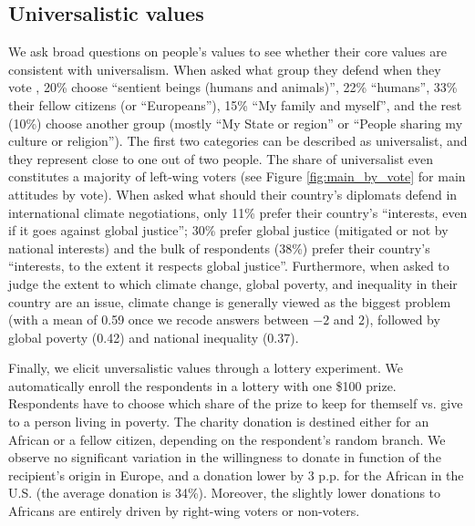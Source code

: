 \subsection{Universalistic values}
We ask broad questions on people's values to see whether their core values are consistent with universalism. When asked what group they defend when they vote%
, 20\% choose ``sentient beings (humans and animals)'', 22\% ``humans'', 33\% their fellow citizens (or ``Europeans''), 15\% ``My family and myself'', and the rest (10\%) choose another group (mostly ``My State or region'' or ``People sharing my culture or religion''). The first two categories can be described as universalist, and they represent close to one out of two people. The share of universalist even constitutes a majority of left-wing voters (see Figure \ref{fig:main_by_vote} for main attitudes by vote). 
When asked what should their country's diplomats defend in international climate negotiations, only 11\% prefer their country's ``interests, even if it goes against global justice''; 30\% prefer global justice (mitigated or not by national interests) and the bulk of respondents (38\%) prefer their country's ``interests, to the extent it respects global justice''. %
Furthermore, when asked to judge the extent to which climate change, global poverty, and inequality in their country are an issue, climate change is generally viewed as the biggest problem (with a mean of 0.59 once we recode answers between $-2$ and $2$), followed by global poverty (0.42) and national inequality (0.37). %

Finally, we elicit unversalistic values through a lottery experiment. We automatically enroll the respondents in a lottery with one \$100 prize. Respondents have to choose which share of the prize to keep for themself vs. give to a person living in poverty. The charity donation is destined either for an African or a fellow citizen, depending on the respondent's random branch. We observe no significant variation in the willingness to donate in function of the recipient's origin in Europe, and a donation lower by 3 p.p. for the African in the U.S. (the average donation is 34\%). Moreover, the slightly lower donations to Africans are entirely driven by right-wing voters or non-voters. 

